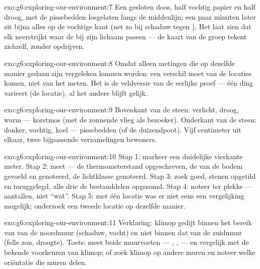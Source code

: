 \begin{solution}{exo:g6:exploring-our-environment:7}
Een gesloten doos, half vochtig papier en half droog, met de pissebedden
losgelaten langs de middenlijn; een paar minuten later zit bijna alles op
de vochtige kant (net zo bij schaduw tegen ). Het laat zien dat elk
 neerstrijkt waar de  bij zijn lichaam passen --- de
kaart van de groep tekent zichzelf, zonder opdrijven.
\end{solution}

\begin{solution}{exo:g6:exploring-our-environment:8}
Omdat alleen metingen die op dezelfde manier gedaan zijn vergeleken
kunnen worden: een verschil moet van de locaties komen, niet van het
meten. Het is de veldversie van de eerlijke proef --- één ding varieert
(de locatie), al het andere blijft gelijk.
\end{solution}

\begin{solution}{exo:g6:exploring-our-environment:9}
Bovenkant van de steen: verlicht, droog, warm --- korstmos (met de
zonnende vlieg als bezoeker). Onderkant van de steen: donker, vochtig,
koel --- pissebedden (of de duizendpoot). Vijf centimeter uit elkaar,
twee bijpassende verzamelingen bewoners.
\end{solution}

\begin{solution}{exo:g6:exploring-our-environment:10}
Stap 1: markeer een duidelijke vierkante meter. Stap 2: meet --- de
thermometerstand opgeschreven, de  van de bodem gevoeld en
genoteerd, de lichtklasse genoteerd. Stap 3: zoek goed, stenen opgetild
en teruggelegd, alle drie de  bestanddelen opgesomd. Stap 4:
noteer ter plekke --- aantallen, niet ``wat''. Stap 5: met één locatie
was er niet eens een vergelijking mogelijk; onderzoek een tweede locatie
op dezelfde manier.
\end{solution}

\begin{solution}{exo:g6:exploring-our-environment:11}
Verklaring: klimop gedijt binnen het bereik van  van de
noordmuur (schaduw, vocht) en niet binnen dat van de zuidmuur (felle zon,
droogte). Toets: meet beide muurvoeten --- , ,
 --- en vergelijk met de bekende voorkeuren van klimop; of zoek
klimop op andere muren en noteer welke oriëntatie die muren delen.
\end{solution}

